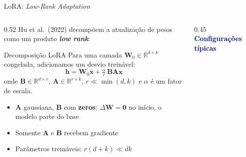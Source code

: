 \documentclass[aspectratio=169, xcolor=dvipsnames]{beamer}
\begin{document}
  \begin{frame}{LoRA: \textit{Low-Rank Adaptation} \cite{hu2022lora}}
    \small
    \begin{columns}[T]
      \begin{column}{0.52\textwidth}
        Hu et al.\ (2022) decompõem a atualização de pesos como um produto
        \textbf{\textit{low rank}}:

        \begin{block}{Decomposição LoRA}
          Para uma camada $\mathbf{W}_0 \in \mathbb{R}^{d \times k}$ congelada,
          adicionamos um desvio treinável:
          \[
            \mathbf{h} = \mathbf{W}_0 \mathbf{x} + \tfrac{\alpha}{r}\, \mathbf{B} \mathbf{A} \mathbf{x}
          \]
          onde $\mathbf{B} \in \mathbb{R}^{d \times r}$, $\mathbf{A} \in \mathbb{R}^{r \times k}$,
          $r \ll \min(d,k)$ e $\alpha$ é um fator de escala.
        \end{block}

        \begin{itemize}
          \item $\mathbf{A}$ gaussiana, $\mathbf{B}$ com \textbf{zeros}: $\Delta\mathbf{W}{=}\mathbf{0}$ no início, o modelo parte do base
          \item Somente $\mathbf{A}$ e $\mathbf{B}$ recebem gradiente
          \item Parâmetros treináveis: $r(d{+}k) \ll dk$
        \end{itemize}
      \end{column}
      \begin{column}{0.45\textwidth}
        \textcolor{DarkBlue}{\textbf{Configurações típicas}}



\end{column}
\end{columns}
\end{frame}
\end{document}
